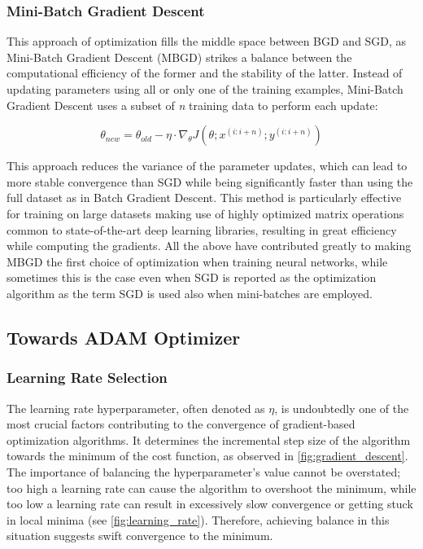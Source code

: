 \subsubsection{Mini-Batch Gradient Descent}
This approach of optimization fills the middle space between BGD and SGD, as Mini-Batch Gradient Descent (MBGD) strikes a balance
between the computational efficiency of the former and the stability of the latter. Instead of updating parameters using all or
only one of the training examples, Mini-Batch Gradient Descent uses a subset of \emph{n} training data to perform each update:

\begin{equation}
    \label{eq:mbgd}
    \theta_{new} = \theta_{old} - \eta \cdot \nabla_{\theta} J(\theta; x^{(i:i+n)}; y^{(i:i+n)})
\end{equation}

This approach reduces the variance of the parameter updates, which can lead to more stable convergence than SGD while being
significantly faster than using the full dataset as in Batch Gradient Descent. This method is particularly effective for training
on large datasets making use of highly optimized matrix operations common to state-of-the-art deep learning libraries, resulting
in great efficiency while computing the gradients. All the above have contributed greatly to making MBGD the first choice of
optimization when training neural networks, while sometimes this is the case even when SGD is reported as the optimization algorithm
as the term SGD is used also when mini-batches are employed.

\subsection{Towards ADAM Optimizer}

\subsubsection{Learning Rate Selection}
The learning rate hyperparameter, often denoted as $\eta$, is undoubtedly one of the most crucial factors contributing to the
convergence of gradient-based optimization algorithms\cite{ruderOverviewGradientDescent2017}. It determines the incremental step
size of the algorithm towards the minimum of the cost function, as observed in \cref{fig:gradient_descent}. The importance of
balancing the hyperparameter's value cannot be overstated; too high a learning rate can cause the algorithm to overshoot the minimum,
while too low a learning rate can result in excessively slow convergence or getting stuck in local minima (see \cref{fig:learning_rate}).
Therefore, achieving balance in this situation suggests swift convergence to the minimum.

